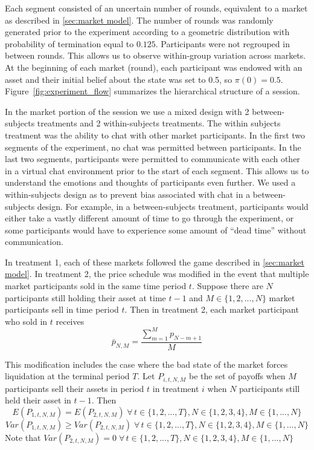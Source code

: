 \documentclass[11pt]{article}
\begin{document}
Each segment consisted of an uncertain number of rounds, equivalent to a market as described in \ref{sec:market model}. The number of rounds was randomly generated prior to the experiment according to a geometric distribution with probability of termination equal to $0.125$. Participants were not regrouped in between rounds. This allows us to observe within-group variation across markets. At the beginning of each market (round), each participant was endowed with an asset and their initial belief about the state was set to 0.5, so $\pi(0) = 0.5$. Figure~\ref{fig:experiment_flow} summarizes the hierarchical structure of a session.



In the market portion of the session we use a mixed design with 2 between-subjects treatments and 2 within-subjects treatments. The within subjects treatment was the ability to chat with other market participants. In the first two segments of the experiment, no chat was permitted between participants. In the last two segments, participants were permitted to communicate with each other in a virtual chat environment prior to the start of each segment. This allows us to understand the emotions and thoughts of participants even further. We used a within-subjects design as to prevent bias associated with chat in a between-subjects design. For example, in a between-subjects treatment, participants would either take a vastly different amount of time to go through the experiment, or some participants would have to experience some amount of ``dead time'' without communication.

In treatment 1, each of these markets followed the game described in \ref{sec:market model}. In treatment 2, the price schedule was modified in the event that multiple market participants sold in the same time period $t$. Suppose there are $N$ participants still holding their asset at time $t-1$ and $M \in \{1,2,...,N\}$ market participants sell in time period $t$. Then in treatment 2, each market participant who sold in $t$ receives \begin{equation}
    \bar{p}_{N,M} = \dfrac{\sum_{m=1}^M p_{N-m+1}}{M}
\end{equation}

This modification includes the case where the bad state of the market forces liquidation at the terminal period $T$. Let $P_{i,t,N,M}$ be the set of payoffs when $M$ participants sell their assets in period $t$ in treatment $i$ when $N$ participants still held their asset in $t-1$. Then
\begin{equation}
    E(P_{1,t,N,M}) = E(P_{2,t,N,M}) \; \forall \, t\in\{1,2,...,T\}, N \in \{1,2,3,4\},M \in \{1,...,N\}
\end{equation}
\begin{equation}
    Var(P_{1,t,N,M}) \ge Var(P_{2,t,N,M}) \; \forall \, t\in\{1,2,...,T\}, N \in \{1,2,3,4\},M \in \{1,...,N\}
\end{equation}
Note that $Var(P_{2,t,N,M}) = 0 \; \forall \, t\in\{1,2,...,T\}, N \in \{1,2,3,4\},M \in \{1,...,N\}$
\end{document}
